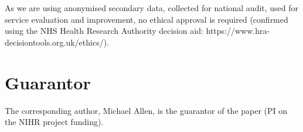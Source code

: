 As we are using anonymised secondary data, collected for national audit, used for service evaluation and improvement, no ethical approval is required (confirmed using the NHS Health Research Authority decision aid: https://www.hra-decisiontools.org.uk/ethics/).

\section*{Guarantor}

The corresponding author, Michael Allen, is the guarantor of the paper (PI on the NIHR project funding).